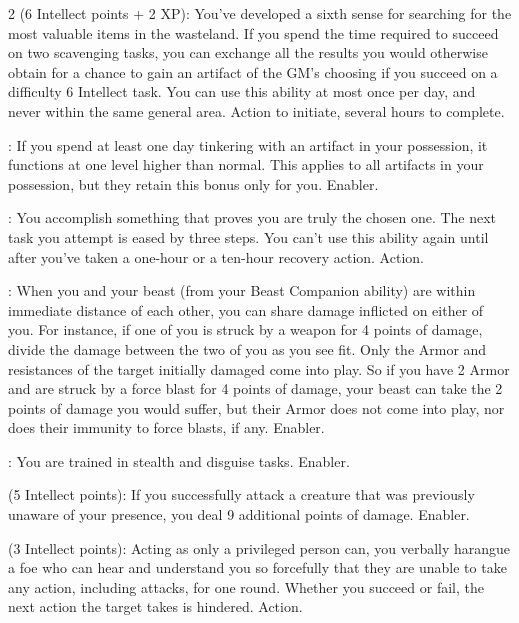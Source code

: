 \begin{multicols}{2}
 (6 Intellect points + 2 XP): You’ve developed a sixth sense for searching for the most valuable items in the wasteland. If you spend the time required to succeed on two scavenging tasks, you can exchange all the results you would otherwise obtain for a chance to gain an artifact of the GM’s choosing if you succeed on a difficulty 6 Intellect task. You can use this ability at most once per day, and never within the same general area. Action to initiate, several hours to complete. 

: If you spend at least one day tinkering with an artifact in your possession, it functions at one level higher than normal. This applies to all artifacts in your possession, but they retain this bonus only for you. Enabler.

: You accomplish something that proves you are truly the chosen one. The next task you attempt is eased by three steps. You can’t use this ability again until after you’ve taken a one-hour or a ten-hour recovery action. Action. 

: When you and your beast (from your Beast Companion ability) are within immediate distance of each other, you can share damage inflicted on either of you. For instance, if one of you is struck by a weapon for 4 points of damage, divide the damage between the two of you as you see fit. Only the Armor and resistances of the target initially damaged come into play. So if you have 2 Armor and are struck by a force blast for 4 points of damage, your beast can take the 2 points of damage you would suffer, but their Armor does not come into play, nor does their immunity to force blasts, if any. Enabler. 

: You are trained in stealth and disguise tasks. Enabler.

 (5 Intellect points): If you successfully attack a creature that was previously unaware of your presence, you deal 9 additional points of damage. Enabler. 

 (3 Intellect points): Acting as only a privileged person can, you verbally harangue a foe who can hear and understand you so forcefully that they are unable to take any action, including attacks, for one round. Whether you succeed or fail, the next action the target takes is hindered. Action.
 

\end{multicols}

